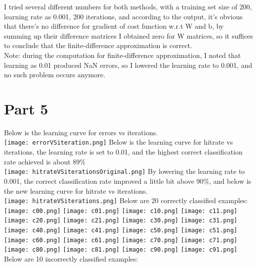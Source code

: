 \documentclass{article}
\begin{document}
\indent \indent \indent I tried several different numbers for both methods, with a training set size of 200, learning rate as 0.001, 200 iterations, and according to the output, it's obvious that there's no difference for gradient of cost function w.r.t W and b, by summing up their difference matrices I obtained zero for W matrices, so it suffices to conclude that the finite-difference approximation is correct.\\
\indent \indent \indent Note: during the computation for finite-difference approximation, I noted that learning as 0.01 produced NaN errors, so I lowered the learning rate to 0.001, and no such problem occurs anymore.
\section*{Part 5}
\indent \indent \indent Below is the learning curve for errors vs iterations.\\
\texttt{[image: errorVSiteration.png]}
\clearpage
\indent \indent \indent Below is the learning curve for hitrate vs iterations, the learning rate is set to 0.01, and the highest correct classification rate achieved is about 89\%\\
\texttt{[image: hitrateVSiterationsOriginal.png]}
\clearpage
\indent \indent \indent By lowering the learning rate to 0.001, the correct classification rate improved a little bit above 90\%, and below is the new learning curve for hitrate vs iterations.\\
\texttt{[image: hitrateVSiterations.png]}
\clearpage
\indent Below are 20 correctly classified examples:\\
\texttt{[image: c00.png]}
\texttt{[image: c01.png]}
\texttt{[image: c10.png]}
\texttt{[image: c11.png]}
\texttt{[image: c20.png]}
\texttt{[image: c21.png]}
\texttt{[image: c30.png]}
\texttt{[image: c31.png]}
\texttt{[image: c40.png]}
\texttt{[image: c41.png]}
\texttt{[image: c50.png]}
\texttt{[image: c51.png]}
\texttt{[image: c60.png]}
\texttt{[image: c61.png]}
\texttt{[image: c70.png]}
\texttt{[image: c71.png]}
\texttt{[image: c80.png]}
\texttt{[image: c81.png]}
\texttt{[image: c90.png]}
\texttt{[image: c91.png]}
\clearpage
\indent Below are 10 incorrectly classified examples:\\
\end{document}

